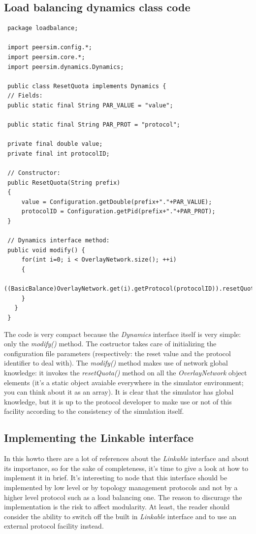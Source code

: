 \documentclass[a4paper,11pt]{article}
\begin{document}
\subsection{Load balancing dynamics class code}

\footnotesize
\begin{verbatim}
 package loadbalance;
 
 import peersim.config.*;
 import peersim.core.*;
 import peersim.dynamics.Dynamics;
 
 public class ResetQuota implements Dynamics {
 // Fields:
 public static final String PAR_VALUE = "value";
 
 public static final String PAR_PROT = "protocol";
 
 private final double value;
 private final int protocolID;
 
 // Constructor:
 public ResetQuota(String prefix)
 {
     value = Configuration.getDouble(prefix+"."+PAR_VALUE);
     protocolID = Configuration.getPid(prefix+"."+PAR_PROT);
 }
 
 // Dynamics interface method:
 public void modify() {
     for(int i=0; i < OverlayNetwork.size(); ++i)
     {
         ((BasicBalance)OverlayNetwork.get(i).getProtocol(protocolID)).resetQuota();
     }
   }
 }
\end{verbatim}
\normalsize

The code is very compact because the \emph{Dynamics} interface itself
is very simple: only the \emph{modify()} method. The costructor takes
care of initializing the configuration file parameters (respectively:
the reset value and the protocol identifier to deal with). The \emph{modify()}
method makes use of network global knowledge: it invokes the \emph{resetQuota()}
method on all the \emph{OverlayNetwork} object elements (it's a static
object avaiable everywhere in the simulator environment; you can think
about it as an array). It is clear that the simulator has global knowledge,
but it is up to the protocol developer to make use or not of this
facility according to the consistency of the simulation itself. 


\subsection{Implementing the Linkable interface}

In this howto there are a lot of references about the \emph{Linkable}
interface and about its importance, so for the sake of completeness,
it's time to give a look at how to implement it in brief. It's interesting
to node that this interface should be implemented by low level or
by topology management protocols and not by a higher level protocol
such as a load balancing one. The reason to discurage the implementation
is the risk to affect modularity. At least, the reader should consider
the ability to switch off the built in \emph{Linkable} interface and
to use an external protocol facility instead.
\end{document}
